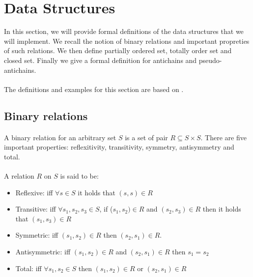 \documentclass[letterpaper]{article}
\theoremstyle{definition}
\begin{document}
\section{Data Structures}

In this section, we will provide formal definitions of the data
structures that we will implement. We recall the notion of binary relations
and important propreties of such relations.
We then define partially ordered set, totally order set and closed set.
Finally we give a formal definition for antichains and pseudo-antichains.

\paragraph{}

The definitions and examples for this section are based on \cite{bohy_phd}.


\subsection{Binary relations}

\paragraph{}

A binary relation for an arbitrary set $S$ is
a set of pair $R \subseteq S \times S$.
There are five important properties: reflexitivity, transitivity,
symmetry, antisymmetry and total.

\paragraph{}

A relation $R$ on $S$ is said to be:

\begin{itemize}
    \item Reflexive:
    iff $\forall s \in S$ it holds that $(s, s) \in R$
    \item Transitive:
    iff $\forall s_1, s_2, s_3 \in S$,
    if ($s_1, s_2) \in R$ and $(s_2, s_3) \in R$
    then it holds that $(s_1, s_3) \in R$
    \item Symmetric: iff $(s_1, s_2) \in R$ then $(s_2, s_1) \in R$.
    \item Antisymmetric: iff $(s_1, s_2) \in R$
    and $(s_2, s_1) \in R$ then $s_1 = s_2$
    \item Total: iff $\forall s_1, s_2 \in S$ then $(s_1, s_2) \in R$
    or $(s_2, s_1) \in R$

\end{itemize}
\end{document}
